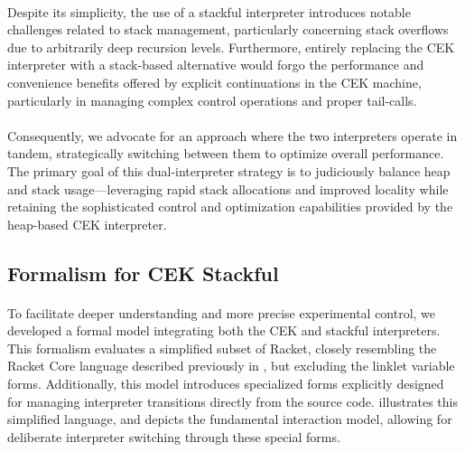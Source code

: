     \paragraph{}%
      Despite its simplicity, the use of a stackful interpreter introduces notable challenges related to stack management, particularly concerning stack overflows due to arbitrarily deep recursion levels. Furthermore, entirely replacing the CEK interpreter with a stack-based alternative would forgo the performance and convenience benefits offered by explicit continuations in the CEK machine, particularly in managing complex control operations and proper tail-calls.

    \paragraph{}%
      Consequently, we advocate for an approach where the two interpreters operate in tandem, strategically switching between them to optimize overall performance. The primary goal of this dual-interpreter strategy is to judiciously balance heap and stack usage—leveraging rapid stack allocations and improved locality while retaining the sophisticated control and optimization capabilities provided by the heap-based CEK interpreter.


    \subsection{Formalism for CEK \+ Stackful}


      \paragraph{}%
        To facilitate deeper understanding and more precise experimental control, we developed a formal model integrating both the CEK and stackful interpreters. This formalism evaluates a simplified subset of Racket, closely resembling the Racket Core language described previously in , but excluding the linklet variable forms. Additionally, this model introduces specialized  forms explicitly designed for managing interpreter transitions directly from the source code.  illustrates this simplified language, and  depicts the fundamental interaction model, allowing for deliberate interpreter switching through these special forms.

